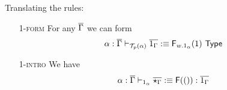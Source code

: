 \documentclass[10pt]{article}
\theoremstyle{definition}
\newcommand{\yields}{\vdash}
\newcommand{\TYPE}{\,\,\mathsf{Type}}
\newcommand\F[2]{\ensuremath{\mathsf{F}_{#1}(#2)}}
\newcommand\FI[1]{\ensuremath{\mathsf{F}{(#1)}}}
\newcommand\El[2]{\mathcal{T}_{#1}(#2)}
\begin{document}
Translating the rules:
\begin{enumerate}[style = multiline, labelwidth = 80pt]
\item[\textsc{1-form}] For any $\overline{\Gamma}$ we can form
\begin{align*}
\alpha : \upstairs{\Gamma} \yields_{\El{p}{\alpha}} \upstairs{1_\Gamma} :\equiv \F{w.1_\alpha}{1} \TYPE
\end{align*}

\item[\textsc{1-intro}] We have
\begin{align*}
\alpha : \upstairs{\Gamma} \yields_{1_\alpha} \upstairs{\star_\Gamma} :\equiv \FI{()} : \upstairs{1_\Gamma}
\end{align*}


\end{enumerate}
\end{document}
